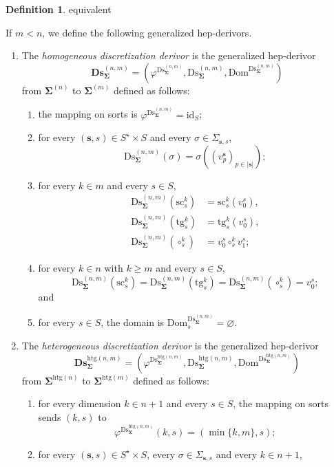 \documentclass[a4paper, reqno]{amsbook}
\makeatletter
\newcommand{\bb}[1]{\ensuremath{\lvert #1 \rvert}}
\newcommand{\sig}[1]{\mathbf{#1}}             %
\newcommand{\Dom}{\mathrm{Dom}}
\newcommand{\htg}{\mathrm{htg}}                %
\newcommand{\id}{\mathrm{id}}
\newcommand{\src}{\mathrm{sc}}
\newcommand{\tgt}{\mathrm{tg}}
\newcommand{\Ds}{\mathrm{Ds}}
\newcommand{\bDs}{\mathbf{Ds}}
\theoremstyle{plain}
\theoremstyle{definition}
\newtheorem{definition}[theorem]{Definition}
\newcommand*{\CA@leanpending}{}
\newcommand*{\CA@leanrelation}{}
\newcommand*{\lean}[2]{%
  \ifcsname\string\color@lean@#1\endcsname\else
    \PackageError{main}{Unknown relation `#1' in \string\lean}{Use equivalent, weaker or stronger.}%
  \fi
  \gdef\CA@leanrelation{#1}%
  \gdef\CA@leanpending{#2}}
\makeatother
\begin{document}
\begin{definition}\label{DDsDerivor}\lean{equivalent}{Dimensions.homogeneousDiscretization,Dimensions.heterogeneousDiscretization}
If $m<n$, we define the following generalized hep-derivors.
\begin{enumerate}
\item The \emph{homogeneous discretization derivor} is the generalized hep-derivor
$$
\bDs^{(n,m)}_{\sig{\Sigma}}=\left(\varphi^{\Ds^{(n,m)}_{\sig{\Sigma}}},\Ds^{(n,m)}_{\sig{\Sigma}},\Dom^{\Ds^{(n,m)}_{\sig{\Sigma}}}\right)
$$
from $\sig{\Sigma}^{(n)}$ to $\sig{\Sigma}^{(m)}$ defined as follows:
\begin{enumerate}
\item the mapping on sorts is $\varphi^{\Ds^{(n,m)}_{\sig{\Sigma}}}=\id_{S}$;
\item for every $(\mathbf{s},s)\in S^{\star}\times S$ and every $\sigma\in\Sigma_{\mathbf{s},s}$,
$$
\Ds^{(n,m)}_{\sig{\Sigma}}(\sigma)=\sigma((v^{\mathbf{s}}_{p})_{p\in\bb{\mathbf{s}}});
$$
\item for every $k\in m$ and every $s\in S$,
\begin{align*}
\Ds^{(n,m)}_{\sig{\Sigma}}(\src^{k}_{s})&=\src^{k}_{s}(v^{s}_{0}),\\
\Ds^{(n,m)}_{\sig{\Sigma}}(\tgt^{k}_{s})&=\tgt^{k}_{s}(v^{s}_{0}),\\
\Ds^{(n,m)}_{\sig{\Sigma}}(\circ^{k}_{s})&=v^{s}_{0}\circ^{k}_{s}v^{s}_{1};
\end{align*}
\item for every $k\in n$ with $k\geq m$ and every $s\in S$,
$$
\Ds^{(n,m)}_{\sig{\Sigma}}(\src^{k}_{s})=\Ds^{(n,m)}_{\sig{\Sigma}}(\tgt^{k}_{s})=\Ds^{(n,m)}_{\sig{\Sigma}}(\circ^{k}_{s})=v^{s}_{0};
$$
and
\item for every $s\in S$, the domain is $\Dom^{\Ds^{(n,m)}_{\sig{\Sigma}}}_{s}=\varnothing$.
\end{enumerate}
\item The \emph{heterogeneous discretization derivor} is the generalized hep-derivor
$$
\bDs^{\htg(n,m)}_{\sig{\Sigma}}=\left(\varphi^{\Ds^{\htg(n,m)}_{\sig{\Sigma}}},\Ds^{\htg(n,m)}_{\sig{\Sigma}},\Dom^{\Ds^{\htg(n,m)}_{\sig{\Sigma}}}\right)
$$
from $\sig{\Sigma}^{\htg(n)}$ to $\sig{\Sigma}^{\htg(m)}$ defined as follows:
\begin{enumerate}
\item for every dimension $k\in n+1$ and every $s\in S$, the mapping on sorts sends $(k,s)$ to
$$
\varphi^{\Ds^{\htg(n,m)}_{\sig{\Sigma}}}(k,s)=(\min\{k,m\},s);
$$
\item for every $(\mathbf{s},s)\in S^{\star}\times S$, every $\sigma\in\Sigma_{\mathbf{s},s}$ and every $k\in n+1$,

\end{enumerate}
\end{enumerate}
\end{definition}
\end{document}
